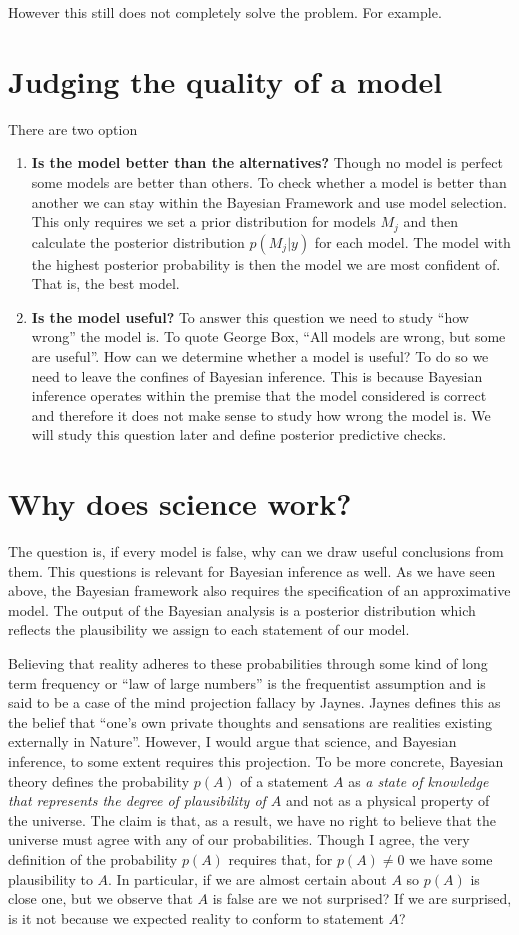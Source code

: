 \documentclass[
    a4paper,
    DIV=14,
    abstract=true,
    numbers=noenddot
]
{scrartcl}
\theoremstyle{definition}
\begin{document}
However this still does not completely solve the problem. For example.
\section{Judging the quality of a model}
There are two option
\begin{enumerate}
    \item \textbf{Is the model better than the alternatives?}  Though no model is perfect some models are better than others. To check whether a model is better than another we can stay within the Bayesian Framework and use model selection. This only requires we set a prior distribution for models $M_j$ and then calculate the posterior distribution $p(M_j|y)$ for each model. The model with the highest posterior probability is then the model we are most confident of. That is, the best model.
    \item \textbf{Is the model useful?} To answer this question we need to study ``how wrong'' the model is.  To quote George Box, ``All models are wrong, but some are useful''. How can we determine whether a model is useful? To do so we need to leave the confines of Bayesian inference. This is because Bayesian inference operates within the premise that the model considered is correct and therefore it does not make sense to study how wrong the model is. We will study this question later and define posterior predictive checks.
\end{enumerate}
\section{Why does science work?}
The question is, if every model is false, why can we draw useful conclusions from them.
This questions is relevant for Bayesian inference as well. As we have seen above, the Bayesian framework also requires the specification of an approximative model. The output of the Bayesian analysis is a posterior distribution which reflects the plausibility we assign to each statement of our model.

Believing that reality adheres to these probabilities through some kind of long term frequency or ``law of large numbers'' is the frequentist assumption and is said to be a case of the mind projection fallacy by Jaynes. Jaynes defines this as the belief that ``one’s own private thoughts and sensations are realities existing externally in Nature''. However, I would argue that science, and Bayesian inference, to some extent requires this projection. To be more concrete, Bayesian theory defines the probability  $p(A)$ of a statement $A$  as \emph{a state of knowledge that represents the degree of plausibility of $A$} and not as a physical property of the universe. The claim is that, as a result, we have no right to believe that the universe must agree with any of our probabilities.  Though I agree, the very definition of the probability $p(A)$  requires that, for $p(A) \neq 0$  we have some plausibility to $A$. In particular, if we are almost certain about $A$ so $p(A)$ is close one, but we observe that $A$ is false are we not surprised? If we are surprised, is it not because we expected reality to conform to statement $A$?
\end{document}

